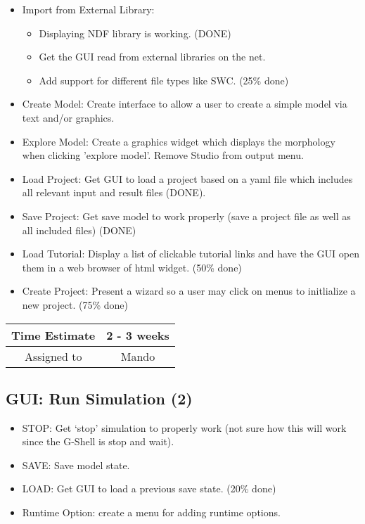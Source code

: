 \documentclass[12pt]{article}
\begin{document}
\begin{itemize}
\item Import from External Library:
  \begin{itemize}
  \item Displaying NDF library is working. (DONE)
  \item Get the GUI read from external libraries on the net.
  \item Add support for different file types like SWC. (25\% done)
  \end{itemize}
\item Create Model: Create interface to allow a user to create a
  simple model via text and/or graphics.
\item Explore Model: Create a graphics widget which displays the
  morphology when clicking 'explore model'.  Remove Studio from output
  menu.
\item Load Project: Get GUI to load a project based on a yaml file
  which includes all relevant input and result files (DONE).
\item Save Project: Get save model to work properly (save a project
  file as well as all included files) (DONE)
\item Load Tutorial: Display a list of clickable tutorial links and
  have the GUI open them in a web browser of html widget. (50\% done)
\item Create Project: Present a wizard so a user may click on menus
  to initlialize a new project. (75\% done)
\end{itemize}

\begin{center}
  \vspace{5mm}
  \centering
  \begin{tabular}{|c|c|}
    \hline
    Time Estimate
    & 2 - 3 weeks \\
    \hline
    Assigned to
    & Mando \\
    \hline
  \end{tabular}
\end{center}


\subsection{GUI: Run Simulation (2)}
\begin{itemize}
\item STOP: Get `stop' simulation to properly work (not sure how this
  will work since the G-Shell is stop and wait).
\item SAVE: Save model state. 
\item LOAD: Get GUI to load a previous save state. (20\% done)
\item Runtime Option: create a menu for adding runtime options.
\end{itemize}
\end{document}
